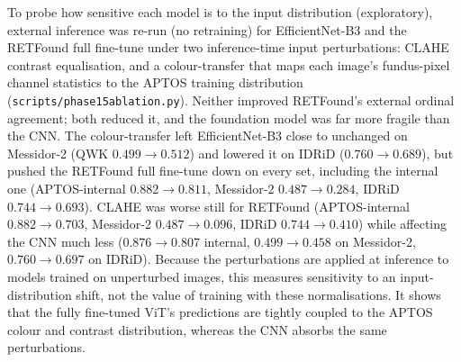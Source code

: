 \documentclass[journal]{IEEEtran}
\renewcommand{\_}{\origunderscore\allowbreak}
\begin{document}
To probe how sensitive each model is to the input distribution (exploratory),
external inference was re-run (no retraining) for EfficientNet-B3 and the RETFound
full fine-tune under two inference-time input perturbations: CLAHE contrast
equalisation, and a colour-transfer that maps each image's fundus-pixel channel
statistics to the APTOS training distribution
(\texttt{scripts/\allowbreak{}phase15\_ablation.py}). Neither improved RETFound's
external ordinal agreement; both reduced it, and the foundation model was far more
fragile than the CNN. The colour-transfer left EfficientNet-B3 close to
unchanged on Messidor-2 (QWK $0.499\to0.512$) and lowered it on IDRiD
($0.760\to0.689$), but pushed the RETFound full fine-tune down on every set,
including the internal one (APTOS-internal $0.882\to0.811$, Messidor-2
$0.487\to0.284$, IDRiD $0.744\to0.693$). CLAHE was worse still for RETFound
(APTOS-internal $0.882\to0.703$, Messidor-2 $0.487\to0.096$, IDRiD
$0.744\to0.410$) while affecting the CNN much less ($0.876\to0.807$ internal,
$0.499\to0.458$ on Messidor-2, $0.760\to0.697$ on IDRiD). Because the
perturbations are applied at inference to models trained on unperturbed images,
this measures sensitivity to an input-distribution shift, not the value of
training with these normalisations. It shows that the fully fine-tuned ViT's
predictions are tightly coupled to the APTOS colour and contrast distribution,
whereas the CNN absorbs the same perturbations.
\end{document}
